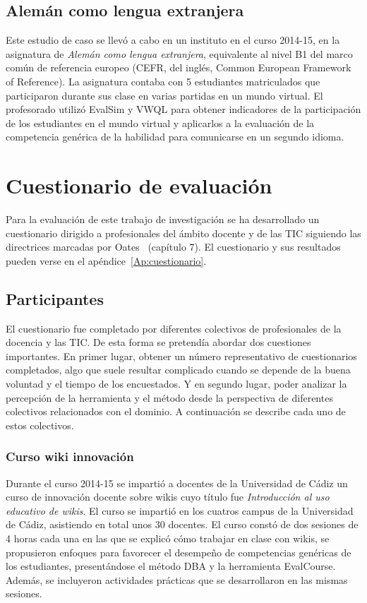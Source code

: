 	\subsection{Alemán como lengua extranjera}

		Este estudio de caso se llevó a cabo en un instituto en el curso 2014-15, en la asignatura de \emph{Alemán como lengua extranjera}, equivalente al nivel B1 del marco común de referencia europeo (CEFR, del inglés, Common European Framework of Reference). La asignatura contaba con 5 estudiantes matriculados que participaron durante sus clase en varias partidas en un mundo virtual. El profesorado utilizó EvalSim y VWQL para obtener indicadores de la participación de los estudiantes en el mundo virtual y aplicarlos a la evaluación de la competencia genérica de la habilidad para comunicarse en un segundo idioma.

\section{Cuestionario de evaluación}

	Para la evaluación de este trabajo de investigación se ha desarrollado un cuestionario dirigido a profesionales del ámbito docente y de las TIC siguiendo las directrices marcadas por Oates~\cite{oates2006researching} (capítulo 7).  El cuestionario y sus resultados pueden verse en el apéndice~\ref{Ap:cuestionario}. 

\subsection{Participantes} \label{eva:participantes}

El cuestionario fue completado por diferentes colectivos de profesionales de la docencia y las TIC. De esta forma se pretendía abordar dos cuestiones importantes. En primer lugar, obtener un número representativo de cuestionarios completados, algo que suele resultar complicado cuando se depende de la buena voluntad y el tiempo de los encuestados. Y en segundo lugar, poder analizar la percepción de la herramienta y el método desde la perspectiva de diferentes colectivos relacionados con el dominio. A continuación se describe cada uno de estos colectivos.

	\subsubsection{Curso wiki innovación}

		Durante el curso 2014-15 se impartió a docentes de la Universidad de Cádiz un curso de innovación docente sobre wikis cuyo título fue \emph{Introducción al uso educativo de wikis}. El curso se impartió en los cuatros campus de la Universidad de Cádiz, asistiendo en total unos 30 docentes. El curso constó de dos sesiones de 4 horas cada una en las que se explicó cómo trabajar en clase con wikis, se propusieron enfoques para favorecer el desempeño de competencias genéricas de los estudiantes, presentándose el método DBA y la herramienta EvalCourse.  Además, se incluyeron actividades prácticas que se desarrollaron en las mismas sesiones. 

